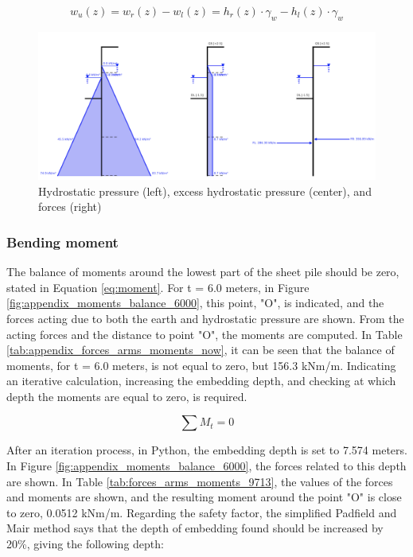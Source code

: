 \begin{equation}
    w_{u}(z) = w_{r}(z) - w_{l}(z) = h_{r}(z) \cdot \gamma_{w} - h_{l}(z) \cdot \gamma_{w}
    \label{eq:excess_water_pressure}
\end{equation}

\begin{figure}[H]
    \centering
    \includegraphics[width=1.0\linewidth]{figures/ch8/overview_water.png}
    \caption{Hydrostatic pressure (left), excess hydrostatic pressure (center), and forces (right)}
    \label{fig:hydrostatic_excess_pressure}
\end{figure}

\subsubsection{Bending moment}

The balance of moments around the lowest part of the sheet pile should be zero,  stated in Equation \ref{eq:moment}. For t = 6.0 meters, in Figure \ref{fig:appendix_moments_balance_6000}, this point, "O", is indicated, and the forces acting due to both the earth and hydrostatic pressure are shown. From the acting forces and the distance to point "O", the moments are computed. In Table \ref{tab:appendix_forces_arms_moments_now}, it can be seen that the balance of moments, for t = 6.0 meters, is not equal to zero, but 156.3 kNm/m. Indicating an iterative calculation, increasing the embedding depth, and checking at which depth the moments are equal to zero, is required.

\begin{equation}
    \sum{M_{t}} = 0
    \label{eq:moment}
\end{equation}

 After an iteration process, in Python, the embedding depth is set to 7.574 meters. In Figure \ref{fig:appendix_moments_balance_6000}, the forces related to this depth are shown. In Table \ref{tab:forces_arms_moments_9713}, the values of the forces and moments are shown, and the resulting moment around the point "O" is close to zero, 0.0512 kNm/m. Regarding the safety factor, the simplified Padfield and Mair method says that the depth of embedding found should be increased by 20\%, giving the following depth:

